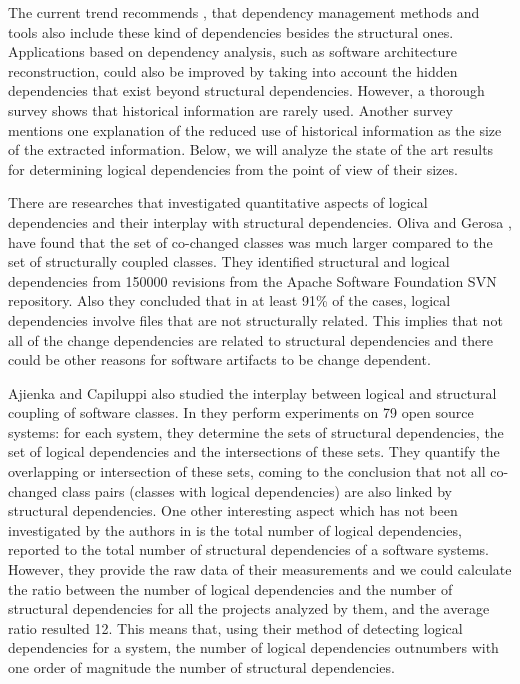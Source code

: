 \documentclass[conference]{IEEEtran}
\begin{document}
The current trend recommends \cite{Oliva:2011:ISL:2067853.2068086}, \cite{DBLP:journals/jss/AjienkaC17} that dependency management methods and tools also include these kind of dependencies besides the structural ones. Applications based on dependency analysis, such as software architecture reconstruction,  could also be improved by taking into account the hidden dependencies that exist beyond structural dependencies. However, a thorough survey \cite{sar} shows that historical information are rarely used. Another survey \cite{Shtern:2012:CMS:2332427.2332428} mentions one explanation of the reduced use of historical information as the size of the extracted information. Below, we will analyze the state of the art results for determining logical dependencies from the point of view of their sizes.

There are researches that investigated quantitative aspects of logical dependencies and their interplay with structural dependencies. 
Oliva and Gerosa \cite{Oliva:2011:ISL:2067853.2068086}, \cite{DBLP:conf/issre/OlivaG15} have found that the set of co-changed classes was much larger compared to the set of structurally coupled classes. They identified structural and logical dependencies from 150000 revisions from the Apache Software Foundation SVN repository. Also they concluded  that in at least 91\% of the cases, logical dependencies involve files that are not structurally related. This implies that not all of the change dependencies are related to structural dependencies and there could be other reasons for software artifacts to be change dependent.

Ajienka and Capiluppi also studied the interplay between logical and structural coupling of software classes. In \cite{DBLP:journals/jss/AjienkaC17} they  perform experiments on 79 open source systems: for each system, they determine the sets of structural dependencies, the set of logical dependencies and the intersections of these sets. They quantify the overlapping or intersection of these sets, coming to the conclusion that not all co-changed class pairs (classes with logical dependencies) are also linked by structural dependencies. One other interesting aspect which has not been investigated by the authors in \cite{DBLP:journals/jss/AjienkaC17}  is the total number of logical dependencies, reported to the total number of structural dependencies of a software systems. However, they provide the raw data of their measurements and we could calculate the ratio between the number of logical dependencies and the number of structural dependencies for all the projects analyzed by them, and the average ratio resulted 12.  This means that, using their method of detecting logical dependencies for a system, the number of logical dependencies outnumbers with one order of magnitude the number of structural dependencies. 
\end{document}
